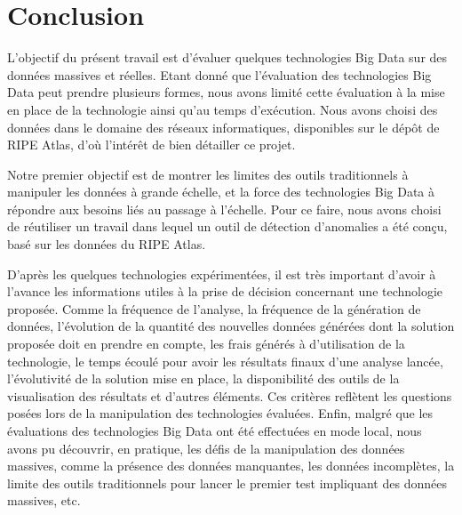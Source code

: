 \chapter*{Conclusion}


L'objectif du présent travail est d'évaluer quelques technologies Big Data sur des données massives et réelles. Etant donné que l'évaluation des technologies Big Data peut prendre plusieurs formes, nous avons 
limité cette évaluation à la mise en place de la technologie ainsi qu'au temps d'exécution.
Nous avons choisi des données dans le domaine des réseaux informatiques,  disponibles sur le dépôt de RIPE Atlas,  d'où l'intérêt  de bien détailler ce projet.


Notre premier objectif est de montrer les limites des outils traditionnels à manipuler les données à grande échelle, et la force des technologies Big Data à répondre aux besoins liés au passage à l'échelle. Pour ce faire, nous avons choisi de réutiliser un travail dans lequel un outil de détection d'anomalies a été conçu,  basé sur les données du RIPE Atlas.  


D'après les quelques technologies expérimentées, il est très important d'avoir à l'avance les informations utiles à la prise de décision concernant une technologie proposée.  Comme la fréquence de l'analyse, la fréquence de la génération de données, l'évolution de la quantité des nouvelles données générées dont la solution proposée doit en prendre en compte, les frais générés  à d'utilisation de la technologie, le temps écoulé pour avoir les résultats finaux d'une analyse lancée, l'évolutivité de la solution mise en place, la disponibilité des outils de la visualisation des résultats et d'autres éléments. Ces critères reflètent les questions posées lors de la  manipulation des technologies évaluées.  Enfin, malgré que les  évaluations des technologies Big Data ont été effectuées en mode local, nous avons pu découvrir, en pratique, les défis de la manipulation des données massives, comme la présence des données manquantes, les données incomplètes,  la limite des outils traditionnels pour lancer le premier test impliquant des données massives, etc. 

